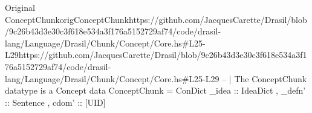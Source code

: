 \begin{haskell}{Original ConceptChunk}{origConceptChunk}{https://github.com/JacquesCarette/Drasil/blob/9c26b43d3e30c3f618e534a3f176a5152729a\newline{}f74/code/drasil-lang/Language/Drasil/Chunk/Concept/Core.hs\#L25-L29}{https://github.com/JacquesCarette/Drasil/blob/9c26b43d3e30c3f618e534a3f176a5152729af74/code/drasil-lang/Language/Drasil/Chunk/Concept/Core.hs\#L25-L29}
-- | The ConceptChunk datatype is a Concept
data ConceptChunk = ConDict { _idea :: IdeaDict
                            , _defn' :: Sentence
                            , cdom' :: [UID]
                            }
\end{haskell}
